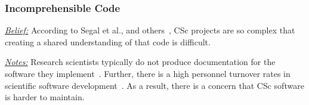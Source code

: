 \documentclass[conference,10pt]{IEEEtran}
\begin{document}









\subsubsection{Incomprehensible Code}\label{tion:codeunderstanding}

\noindent \textit{\underline{Belief:}} According to
Segal et al., and others~\cite{segal_enduser, carver06_hpc, Shull05_parallel, sanders08_risk},
CSc projects are so complex that creating
a shared understanding of that code is difficult. 


\noindent \textit{\underline{Notes:}} Research scientists typically do not produce documentation for the software they implement~\cite{segal_enduser, sanders08_risk}.
Further, there is a high personnel turnover rates in scientific software development~\cite{carver06_hpc, segal_enduser}. As a result, there is a concern that CSc software is harder to maintain. 
\end{document}
